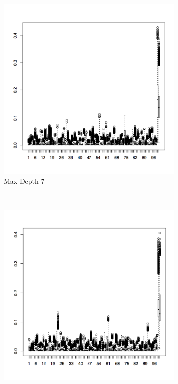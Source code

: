 \documentclass{article}
\begin{document}
\begin{figure}[H]
        \centering
        \begin{subfigure}[b]{0.3\textwidth}
                \centering
                \includegraphics[width=\textwidth]{c7_boxp}
                \caption{Max Depth 7}
                \label{fig:gull}
        \end{subfigure}%
        ~ %
        \begin{subfigure}[b]{0.3\textwidth}
                \centering
                \includegraphics[width=\textwidth]{c8_boxp}

\end{subfigure}
\end{figure}
\end{document}
